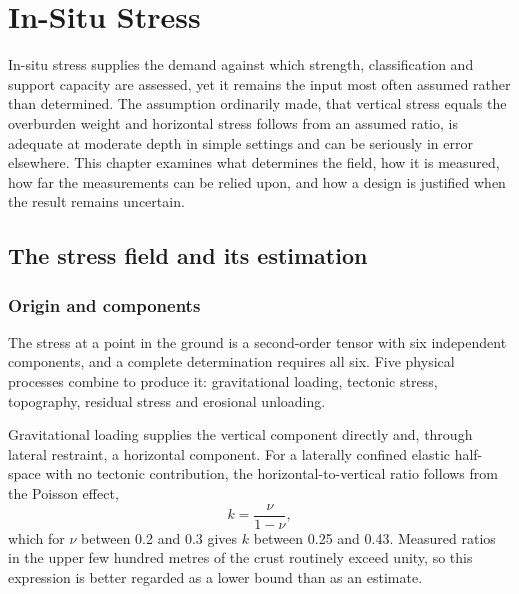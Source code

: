\chapter{In-Situ Stress}
\label{ch:in-situ-stress}

In-situ stress supplies the demand against which strength, classification and
support capacity are assessed, yet it remains the input most often assumed
rather than determined. The assumption ordinarily made, that vertical stress equals the
overburden weight and horizontal stress follows from an assumed ratio, is
adequate at moderate depth in simple settings and can be seriously in error
elsewhere. This chapter examines what determines the field, how it is
measured, how far the measurements can be relied upon, and how a design is
justified when the result remains uncertain.

\section{The stress field and its estimation}
\label{sec:stress-field}

\subsection{Origin and components}
\label{sec:stress-components}

The stress at a point in the ground is a second-order tensor with six
independent components, and a complete determination requires all six. Five
physical processes combine to produce it: gravitational loading, tectonic
stress, topography, residual stress and erosional unloading.

Gravitational loading supplies the vertical component directly and, through
lateral restraint, a horizontal component. For a laterally confined elastic
half-space with no tectonic contribution, the horizontal-to-vertical ratio
follows from the Poisson effect,
\[
k = \frac{\nu}{1-\nu},
\]
which for $\nu$ between 0.2 and 0.3 gives $k$ between 0.25 and 0.43. Measured
ratios in the upper few hundred metres of the crust routinely exceed unity, so
this expression is better regarded as a lower bound than as an estimate.

